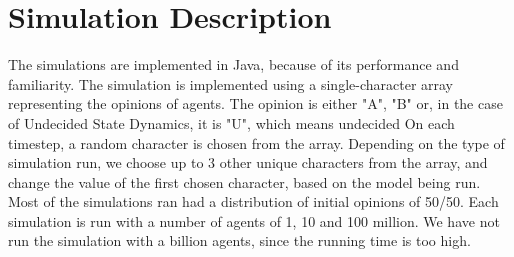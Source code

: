 \section{Simulation Description}
\label{description}
The simulations are implemented in Java, because of its performance and familiarity. The simulation is implemented using a single-character array representing the opinions of agents. The opinion is either "A", "B" or, in the case of Undecided State Dynamics, it is "U", which means undecided On each timestep, a random character is chosen from the array. Depending on the type of simulation run, we choose up to 3 other unique characters from the array, and change the value of the first chosen character, based on the model being run. Most of the simulations ran had a distribution of initial opinions of 50/50. Each simulation is run with a number of agents of 1, 10 and 100 million. We have not run the simulation with a billion agents, since the running time is too high.